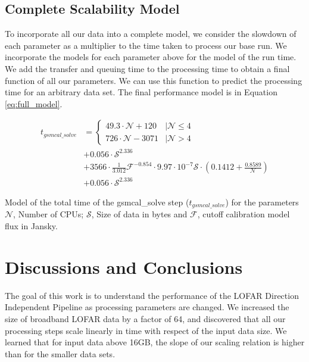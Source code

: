 \documentclass[preprint,5p]{elsarticle}
\begin{document}
\subsection{Complete Scalability Model}
To incorporate all our data into a complete model, we consider the slowdown of each parameter as a multiplier to the time taken to process our base run. We incorporate the models for each parameter above for the model of the run time. We add the transfer and queuing time to the processing time to obtain a final function of all our parameters. We can use this function to predict the processing time for an arbitrary data set. The final performance model is in Equation \ref{eq:full_model}. 

\begin{equ*}[!t]
\normalsize
\begin{equation}
    \begin{split}
   t_{gsmcal\_solve} & = \begin{cases}
        49.3\cdot\mathcal{N}+ 120 &|\mathcal{N}\leq4\\
        726\cdot\mathcal{N}-3071 & |\mathcal{N}>4
       \end{cases} \\
       & + 0.056\cdot \mathcal{S}^{2.336} \\ 
       & + 3566\cdot \frac{1}{3.012}\mathcal{F}^{-0.854} \cdot 9.97\cdot10^{-7}\mathcal{S}\cdot (0.1412+\frac{0.8589}{\mathcal{N}}) \\
       & + 0.056\cdot \mathcal{S}^{2.336} 
       \end{split}
 \label{eq:full_model}
 \end{equation}
\caption{Model of the total time of the {\selectfont gsmcal\_solve} step ($t_{gsmcal\_solve}$) for the parameters $\mathcal{N}$, Number of CPUs; $\mathcal{S}$, Size of data in bytes and $\mathcal{F}$, cutoff calibration model flux in Jansky. }
\end{equ*}

\section{Discussions and Conclusions}\label{sec:discussions}

The goal of this work is to understand the performance of the LOFAR Direction Independent Pipeline as processing parameters are changed. We increased the size of broadband LOFAR data by a factor of 64, and discovered that all our processing steps scale linearly in time with respect of the input data size. We learned that for input data above 16GB, the slope of our scaling relation is higher than for the smaller data sets.
\end{document}
